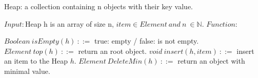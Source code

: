 \documentclass[10pt]{article}
\begin{document}
\begin{algorithm}[H]
\renewcommand{\thealgorithm}{}

\caption{Heap: a collection containing n objects with their key value.}
\label{protocol1}
\begin{algorithmic}
\STATE $Input :$\quad Heap h is an array of size n, $item \in Element\ and\ n\ \in \mathbb{N}.$
\STATE 
\STATE $Function :$ 

\STATE \qquad\qquad $Boolean\ isEmpty(h)\ ::=$ true: empty / false: is not empty.
\STATE \qquad\qquad $Element\ top(h)\ ::=$ return an root object.
\STATE \qquad\qquad $void\ insert(h, item)\ ::=$ insert an item to the Heap $h$.
\STATE \qquad\qquad $Element\ DeleteMin(h)\ ::=$ return an object with minimal value.

\end{algorithmic}
\end{algorithm} 
\end{document}
